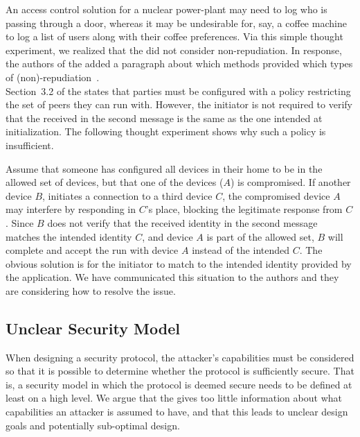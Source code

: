 \documentclass[runningheads, envcountsame, hidelinks, a4paper, x11names]{llncs}
\begin{document}
An access control solution for a nuclear power-plant may need to log who is
passing through a door, whereas it may be undesirable for, say, a coffee
machine to log a list of users along with their coffee preferences.
%
Via this simple thought experiment, we realized that the \mSpec{} did not
consider non-repudiation.
%
In response, the authors of the \mSpec{} added a paragraph about which methods
provided which types of (non)-repudiation~\cite{selander-lake-edhoc-01}. \\

Section~3.2 of the \mSpec{} states that parties must be configured
with a policy restricting the set of peers they can run \mEdhoc{} with.
%
However, the initiator is not required to verify that the \mIdcredr{} received
in the second message is the same as the one intended at initialization.
%
The following thought experiment shows why such a policy is insufficient.
%

Assume that someone has configured all devices in their home to be in the
allowed set of devices, but that one of the devices ($A$) is compromised.
%
If another device $B$, initiates a connection to a third device $C$, the
compromised device $A$ may interfere by responding in $C$'s place, blocking
the legitimate response from $C$.
%
Since $B$ does not verify that the received identity in the second message
matches the intended identity $C$, and device $A$ is part of the allowed set,
$B$ will complete and accept the \mEdhoc{} run with device $A$ instead of the
intended $C$.
%
The obvious solution is for the initiator to match \mIdcredr{} to the intended
identity provided by the application.
%
We have communicated this situation to the \mEdhoc{} authors and they are considering
how to resolve the issue.
%

\subsection{Unclear Security Model}
When designing a security protocol, the attacker's capabilities must be
considered so that it is possible to determine whether the protocol is
sufficiently secure.
%
That is, a security model in which the protocol is deemed
secure needs to be defined at least on a high level.
%
We argue that the \mSpec{} gives too little information about what capabilities
an attacker is assumed to have, and that this leads to unclear design goals and
potentially sub-optimal design.
%
%
\end{document}

